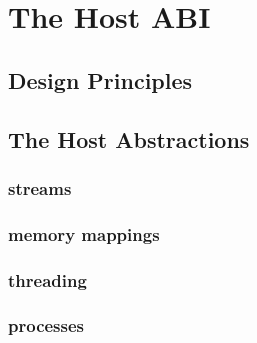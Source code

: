 \chapter{The Host ABI}
\label{chap:host}

\section{Design Principles}

\section{The Host Abstractions}

\subsection{streams}

\subsection{memory mappings}

\subsection{threading}

\subsection{processes}
